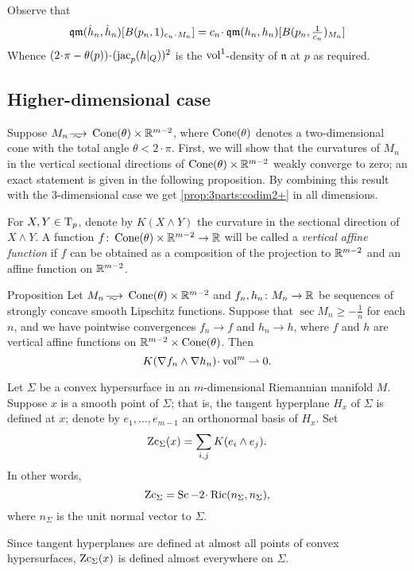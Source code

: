 Observe that 
\[\qm(\hat h_n, \hat h_n)[B(p_n,1)_{c_n\cdot M_n}]
=
c_n\cdot \qm(h_n, h_n)[B(p_n,\tfrac1{c_n})_{M_n}]\]
Whence $(2\cdot \pi-\theta(p))\cdot(\jac_p(h|_Q))^2$ is the $\operatorname{vol}^1$-density of $\mathfrak n$ at $p$ as required.
\qeds

\subsection{Higher-dimensional case}\label{subsec:4d}


Suppose $M_n\smooths{} \Cone(\theta)\times \RR^{m-2}$, where $\operatorname{Cone}(\theta)$ denotes a two-dimensional cone with the total angle $\theta<2\cdot\pi$.
First, we will show that the curvatures of $M_n$ in the vertical sectional directions of $\operatorname{Cone}(\theta)\times \mathbb{R}^{m-2}$ weakly converge to zero;
an exact statement is given in the following proposition.
By combining this result with the 3-dimensional case we get \ref{prop:3parts:codim2+} in all dimensions.

For $X,Y\in \mathrm{T}_p$, denote by $K(X\wedge Y)$ the curvature in the sectional direction of $X\wedge Y$.
A function $f\colon\operatorname{Cone}(\theta)\times\mathbb{R}^{m-2}\to\mathbb{R}$ will be called a \emph{vertical affine function} if $f$ can be obtained as a composition of the projection to $\mathbb{R}^{m-2}$ and an affine function on $\mathbb{R}^{m-2}$.

\begin{thm}{Proposition}\label{prop:vert-vert}
Let $M_n\smooths{} \Cone(\theta)\times\RR^{m-2}$
and $f_n,h_n\: M_n\zz\to \RR$ be sequences of strongly concave smooth Lipschitz functions.
Suppose that $\sec M_n\ge -\tfrac1n$ for each $n$,
and we have pointwise convergences $f_n\to f$ and $h_n\to h$, where $f$ and $h$ are vertical affine functions on $\mathbb{R}^{m-2}\times \operatorname{Cone}(\theta)$.
Then 
\[K(\nabla f_n\wedge\nabla h_n)\cdot\vol^m \rightharpoonup0.\]

\end{thm}

Let $\Sigma$ be a convex hypersurface in an $m$-dimensional Riemannian manifold $M$.
Suppose $x$ is a smooth point of $\Sigma$; that is, the tangent hyperplane $H_x$ of $\Sigma$ is defined at $x$;
denote by $e_1,\dots,e_{m-1}$ an orthonormal basis of $H_x$.
Set 
\[\operatorname{\rm Zc}_\Sigma(x)= \sum_{i,j} K(e_i\wedge e_j).\]
In other words, 
\[\Zc_\Sigma=\Sc-2\cdot\Ric(n_\Sigma,n_\Sigma),\]
where $n_\Sigma$ is the unit normal vector to $\Sigma$.

Since tangent hyperplanes are defined at almost all points of convex hypersurfaces,
 $\operatorname{\rm Zc}_\Sigma(x)$ is defined almost everywhere on $\Sigma$.

